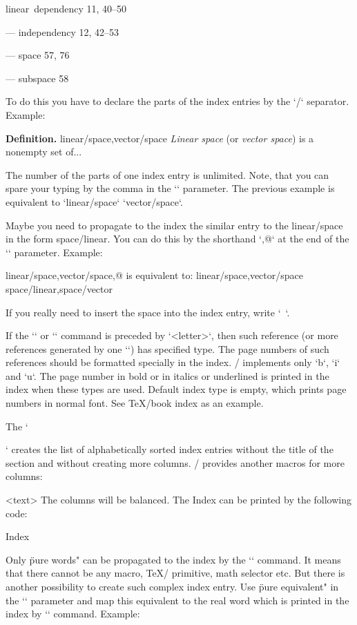 {\medskip

linear~dependency  11, 40--50

--- independency 12, 42--53

--- space 57, 76

--- subspace 58

\medskip

To do this you have to declare the parts of the index entries by the `/` separator.
Example:

\begtt
{\bf Definition.}
\ii linear/space,vector/space
{\em Linear space} (or {\em vector space}) is a nonempty set of...
\endtt

The number of the parts of one index entry is unlimited. Note, that you can
spare your typing by the comma in the `\ii` parameter. The previous example
is equivalent to `\ii linear/space` `\ii vector/space`.

Maybe you need to propagate to the index the similar entry to the
linear/space in the form space/linear. You can do this by the shorthand `,@`
at the end of the `\ii` parameter. Example:

\begtt
\ii linear/space,vector/space,@
is equivalent to:
\ii linear/space,vector/space \ii space/linear,space/vector
\endtt

If you really need to insert the space into the index entry, write `~`.

If the `\ii` or `\iid` command is preceded by `\iitype <letter>`, then such
reference (or more references generated by one `\ii`) has specified type.
The page numbers of such references should be formatted
specially in the index. \OpTeX/ implements only `\iitype b`, `\iitype i` and
`\iitype u`. The page number in bold or in italics or underlined is printed
in the index when these types are used. Default index type is empty, which
prints page numbers in normal font. See \TeX/book index as an example.

The `\makeindex` creates the list of alphabetically sorted index entries
without the title of the section and without creating more columns. \OpTeX/
provides another macros for more columns: 

\begtt
{}
<text>
\endmulti
\endtt
The columns will be balanced. The Index can be printed by the following
code:

\begtt
\sec Index
 \makeindex \endmulti
\endtt

Only \"pure words" can be propagated to the index by the `\ii` command. It
means that there cannot be any macro, \TeX/ primitive, math selector etc.
But there is another possibility to create such complex index entry. Use
\"pure equivalent" in the `\ii` parameter and map this equivalent to the
real word which is printed in the index by `\iis` command. Example:

}
